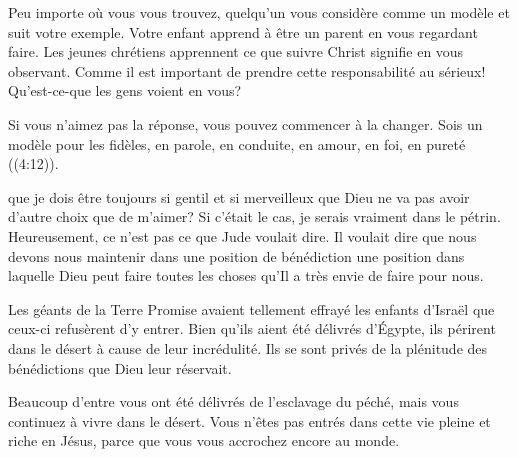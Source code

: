 Peu importe où vous vous trouvez, quelqu'un vous considère comme un modèle
 et suit votre exemple. Votre enfant apprend à être un parent en vous
 regardant faire. Les jeunes chrétiens apprennent ce que suivre Christ
 signifie en vous observant. Comme il est important de prendre
 cette responsabilité au sérieux! Qu'est-ce-que les gens voient en vous? 

Si vous n'aimez pas la réponse, vous pouvez commencer à la changer.
 \og Sois un modèle pour les fidèles, en parole, en conduite,
 en amour, en foi, en pureté \fg{} ((4:12)). 

\dvrule







 que je dois être toujours 
 si gentil et si merveilleux que Dieu ne va pas avoir
 d'autre choix que de m'aimer?
 Si c'était le cas, je serais vraiment dans le pétrin.
 Heureusement, ce n'est pas ce que Jude voulait dire.
 Il voulait dire que nous devons nous maintenir
 dans une position de bénédiction
 \ocadr une position dans laquelle Dieu peut faire toutes les choses
 qu'Il a très envie de faire pour nous. 

Les géants de la Terre Promise avaient tellement effrayé
 les enfants d'Israël que ceux-ci refusèrent d'y entrer.
 Bien qu'ils aient été délivrés d'Égypte, 
 ils périrent dans le désert à cause de leur incrédulité.
 Ils se sont privés de la plénitude des bénédictions
 que Dieu leur réservait.


Beaucoup d'entre vous ont été délivrés de l'esclavage du péché,
 mais vous continuez à vivre dans le désert.
 Vous n'êtes pas entrés dans cette vie pleine et riche en Jésus,
 parce que vous vous accrochez encore au monde. 


